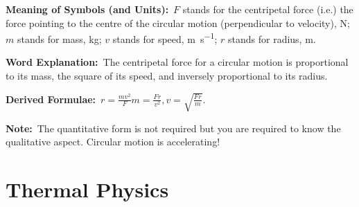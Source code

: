 \documentclass[8pt]{article}
\newcommand{\MeanSymb}{\textbf{Meaning of Symbols (and Units):}\ }
\newcommand{\WordExpl}{\textbf{Word Explanation:}\ }
\newcommand{\DeriForm}{\textbf{Derived Formulae:}\ }
\newcommand{\Note}{\textbf{Note:}\ }
\begin{document}
\begin{enumerate}
                \MeanSymb \(F\) stands for the centripetal force (i.e.) the force pointing to the centre of the circular motion (perpendicular to velocity), \unit{\newton}; \(m\) stands for mass, \unit{\kilogram}; \(v\) stands for speed, \unit{\metre\per\second}; \(r\) stands for radius, \unit{\metre}.

                \WordExpl The centripetal force for a circular motion is proportional to its mass, the square of its speed, and inversely proportional to its radius.

                \DeriForm \(r = \frac{mv^2}{F} m = \frac{Fr}{v^2}, v = \sqrt{\frac{Fr}{m}}\).

                \Note The quantitative form is not required but you are required to know the qualitative aspect. Circular motion is accelerating!
            \end{enumerate}

    \section{Thermal Physics}
\end{document}

